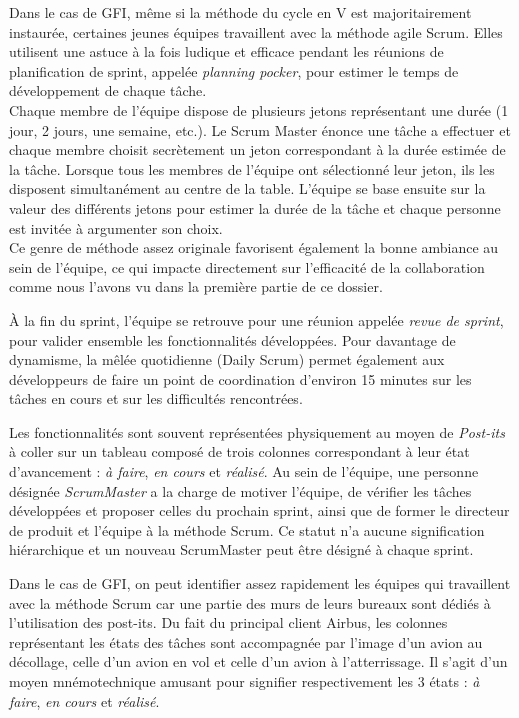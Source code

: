 \begin{app}
Dans le cas de GFI, même si la méthode du cycle en V est majoritairement instaurée, certaines jeunes équipes travaillent avec la méthode agile Scrum. Elles utilisent une astuce à la fois ludique et efficace pendant les réunions de planification de sprint, appelée \textit{planning pocker}, pour estimer le temps de développement de chaque tâche.\\
Chaque membre de l'équipe dispose de plusieurs jetons représentant une durée (1 jour, 2 jours, une semaine, etc.). Le Scrum Master énonce une tâche a effectuer et chaque membre choisit secrètement un jeton correspondant à la durée estimée de la tâche. Lorsque tous les membres de l'équipe ont sélectionné leur jeton, ils les disposent simultanément au centre de la table. L'équipe se base ensuite sur la valeur des différents jetons pour estimer la durée de la tâche et chaque personne est invitée à argumenter son choix.\\
Ce genre de méthode assez originale favorisent également la bonne ambiance au sein de l'équipe, ce qui impacte directement sur l'efficacité de la collaboration comme nous l'avons vu dans la première partie de ce dossier.
\end{app}

À la fin du sprint, l'équipe se retrouve pour une réunion appelée \textit{revue de sprint}, pour valider ensemble les fonctionnalités développées.
Pour davantage de dynamisme, la mêlée quotidienne (Daily Scrum) permet également aux développeurs de faire un point de coordination d'environ 15 minutes sur les tâches en cours et sur les difficultés rencontrées.

Les fonctionnalités sont souvent représentées physiquement au moyen de \textit{Post-its} à coller sur un tableau composé de trois colonnes correspondant à leur état d'avancement : \textit{à faire}, \textit{en cours} et \textit{réalisé}. Au sein de l'équipe, une personne désignée \textit{ScrumMaster} a la charge de motiver l'équipe, de vérifier les tâches développées et proposer celles du prochain sprint, ainsi que de former le directeur de produit et l'équipe à la méthode Scrum. Ce statut n'a aucune signification hiérarchique et un nouveau ScrumMaster peut être désigné à chaque sprint.

\begin{app}
Dans le cas de GFI, on peut identifier assez rapidement les équipes qui travaillent avec la méthode Scrum car une partie des murs de leurs bureaux sont dédiés à l'utilisation des post-its. Du fait du principal client Airbus, les colonnes représentant les états des tâches sont accompagnée par l'image d'un avion au décollage, celle d'un avion en vol et celle d'un avion à l'atterrissage. Il s'agit d'un moyen mnémotechnique amusant pour signifier respectivement les 3 états : \textit{à faire}, \textit{en cours} et \textit{réalisé}.
\end{app}

